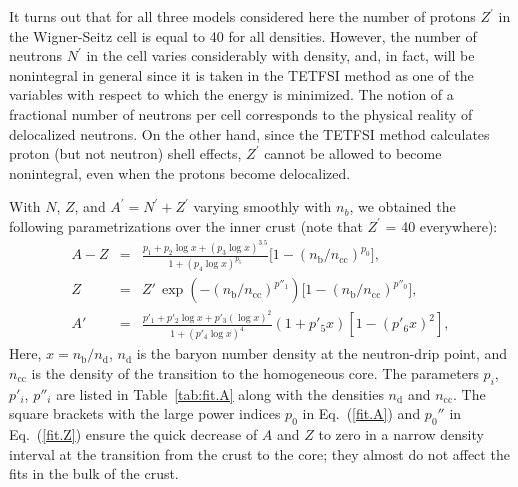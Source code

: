 \documentclass{aa}
\newcommand{\req}[1]{Eq.~(\ref{#1})}
\newcommand{\nb}{n_\mathrm{b}}
\newcommand{\nc}{n_\mathrm{cc}}
\newcommand{\nd}{n_\mathrm{d}}
\begin{document}
It turns out that for all three models considered here the number of protons 
$Z^\prime$ in the Wigner-Seitz cell is equal to 40 for all densities. However, 
the number of neutrons $N^\prime$ in the cell varies considerably with density,
and, in fact, will be nonintegral in general since it is taken in the TETFSI
method as one of the variables with respect to which the
energy is minimized.
The notion of a fractional number of neutrons per cell corresponds to
the  physical reality of delocalized neutrons. On the other hand, since the 
TETFSI method calculates proton (but not neutron) shell effects, $Z^\prime$
cannot be allowed to become nonintegral, even when the protons become 
delocalized.

With $N$, $Z$, and $A^\prime = N^\prime + Z^\prime$ varying smoothly with
$n_b$,  we obtained the following parametrizations over the inner crust (note
that $Z^\prime$ = 40 everywhere):
\begin{eqnarray}
   A-Z &=&
 \frac{
        p_1 + p_2 \log x + (p_3 \log x)^{3.5}
         }{
           1 + (p_4 \log x)^{p_5}}
                   \big[1-(\nb/\nc)^{p_0}\big],
\label{fit.A}
\\
  Z &=& Z'\,\exp\left( -(\nb/\nc)^{p''_1} \right)
                   \big[1-(\nb/\nc)^{p''_0}\big],
\label{fit.Z}
\\
   A' &=& \frac{
        p'_1 + p'_2 \log x +p'_3 (\log x)^2
         }{ 1 + (p'_4 \log x)^4 }
            (1 + p'_5 x) \left[1-(p'_6 x)^2\right],
\label{fit.A'}
\end{eqnarray}
Here, $x = \nb/\nd$, $\nd$ is the baryon number density at the neutron-drip 
point, and $\nc$ is the density of the transition to the homogeneous core. The 
parameters $p_i$, $p'_i$, $p''_i$ are listed in Table~\ref{tab:fit.A} along 
with the densities $\nd$ and $\nc$. The square brackets with the large power 
indices $p_0$ in \req{fit.A} and $p_0''$ in \req{fit.Z} ensure the quick
decrease of $A$ and $Z$ to zero in a narrow density interval at the transition 
from the crust to the core; they almost do not affect the fits in the bulk of 
the crust.
           
\end{document}
